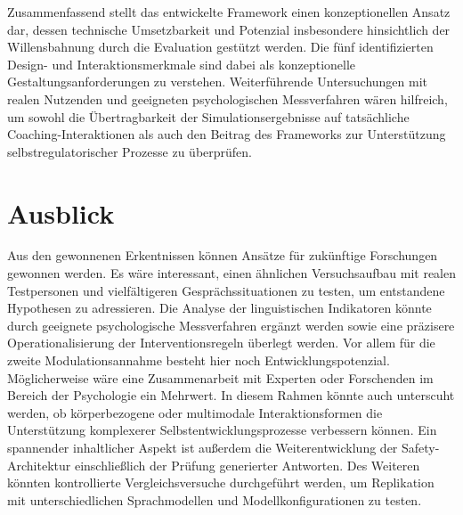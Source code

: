 Zusammenfassend stellt das entwickelte Framework einen konzeptionellen Ansatz dar, dessen technische Umsetzbarkeit und Potenzial insbesondere hinsichtlich der Willensbahnung durch die Evaluation gestützt werden. Die fünf identifizierten Design- und Interaktionsmerkmale sind dabei als konzeptionelle Gestaltungsanforderungen zu verstehen. Weiterführende Untersuchungen mit realen Nutzenden und geeigneten psychologischen Messverfahren wären hilfreich, um sowohl die Übertragbarkeit der Simulationsergebnisse auf tatsächliche Coaching-Interaktionen als auch den Beitrag des Frameworks zur Unterstützung selbstregulatorischer Prozesse zu überprüfen.


\section{Ausblick}
Aus den gewonnenen Erkentnissen können Ansätze für zukünftige Forschungen gewonnen werden. 
Es wäre interessant, einen ähnlichen Versuchsaufbau mit realen Testpersonen und vielfältigeren Gesprächssituationen zu testen, um entstandene Hypothesen zu adressieren.
Die Analyse der linguistischen Indikatoren könnte durch geeignete psychologische Messverfahren ergänzt werden sowie eine präzisere Operationalisierung der Interventionsregeln überlegt werden. Vor allem für die zweite Modulationsannahme besteht hier noch Entwicklungspotenzial. Möglicherweise wäre eine Zusammenarbeit mit Experten oder Forschenden im Bereich der Psychologie ein Mehrwert. In diesem Rahmen könnte auch unterscuht werden, ob körperbezogene oder multimodale Interaktionsformen die Unterstützung komplexerer Selbstentwicklungsprozesse verbessern können.
Ein spannender inhaltlicher Aspekt ist außerdem die Weiterentwicklung der Safety-Architektur einschließlich der Prüfung generierter Antworten.
Des Weiteren könnten kontrollierte Vergleichsversuche durchgeführt werden, um Replikation mit unterschiedlichen Sprachmodellen und Modellkonfigurationen zu testen.

